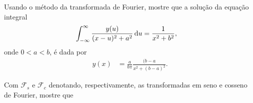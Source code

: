 \documentclass[a4paper,12pt, leqno, answers]{exam}
\begin{document}
\begin{questions}
    \question Usando o método da transformada de Fourier, mostre que a
    solução da equação integral
    \begin{align*}
        \int_{-\infty}^\infty \frac{y(u)}{(x - u)^2 + a^2} \, \mathrm{d}u &=
        \frac{1}{x^2 + b^2},
    \end{align*}
    onde $0 < a < b$, é dada por
    \begin{align*}
        y(x) &= \frac{a}{b \pi} \frac{(b - a}{x^2 + (b - a)^2}.
    \end{align*}
    \begin{solution}
    \end{solution}

    \question Com $\mathcal{F}_s$ e $\mathcal{F}_c$ denotando, respectivamente,
    as transformadas em seno e cosseno de Fourier, mostre que


\end{questions}
\end{document}
